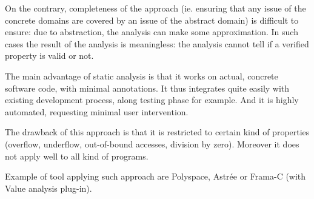 On the contrary, completeness of the approach (ie. ensuring that any issue of the concrete domains are covered by an issue of the abstract domain) is difficult to ensure:
due to abstraction, the analysis can make some approximation. In such
cases the result of the analysis is meaningless: the analysis cannot
tell if a verified property is valid or not.

The main advantage of static analysis is that it works on actual,
concrete software code, with minimal annotations. It thus integrates
quite easily with existing development process, along testing phase
for example. And it is highly automated, requesting minimal user
intervention.

The drawback of this approach is that it is restricted to certain kind
of properties (overflow, underflow, out-of-bound accesses, division by
zero). Moreover it does not apply well to all kind of programs.


Example of tool applying such approach are Polyspace, Astrée or
Frama-C (with Value analysis plug-in).



















